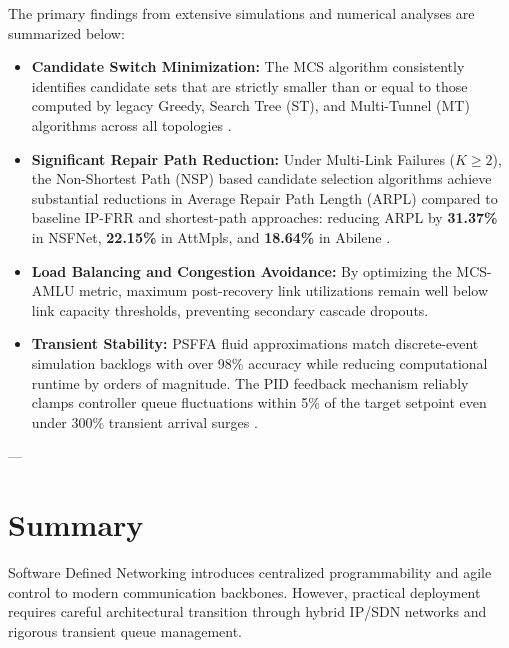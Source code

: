 The primary findings from extensive simulations and numerical analyses are summarized below:
\begin{itemize}
    \item \textbf{Candidate Switch Minimization:} The MCS algorithm consistently identifies candidate sets that are strictly smaller than or equal to those computed by legacy Greedy, Search Tree (ST), and Multi-Tunnel (MT) algorithms across all topologies \cite{vuppalapati2022minimum}.
    \item \textbf{Significant Repair Path Reduction:} Under Multi-Link Failures ($K \ge 2$), the Non-Shortest Path (NSP) based candidate selection algorithms achieve substantial reductions in Average Repair Path Length (ARPL) compared to baseline IP-FRR and shortest-path approaches: reducing ARPL by \textbf{31.37\%} in NSFNet, \textbf{22.15\%} in AttMpls, and \textbf{18.64\%} in Abilene \cite{vuppalapati2025candidate}.
    \item \textbf{Load Balancing and Congestion Avoidance:} By optimizing the MCS-AMLU metric, maximum post-recovery link utilizations remain well below link capacity thresholds, preventing secondary cascade dropouts.
    \item \textbf{Transient Stability:} PSFFA fluid approximations match discrete-event simulation backlogs with over 98\% accuracy while reducing computational runtime by orders of magnitude. The PID feedback mechanism reliably clamps controller queue fluctuations within 5\% of the target setpoint even under 300\% transient arrival surges \cite{vuppalapati2021modeling}.
\end{itemize}

---

\section{Summary}
\label{sec:sdn_summary}

Software Defined Networking introduces centralized programmability and agile control to modern communication backbones. However, practical deployment requires careful architectural transition through hybrid IP/SDN networks and rigorous transient queue management.


